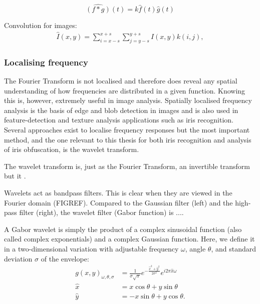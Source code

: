 \begin{equation}
    \widehat{(f*g)}(t) = k\hat{f}(t)\hat{g}(t)
\end{equation}

Convolution for images:
\begin{align}
    \hat{I}(x, y) = \sum_{i=x-s}^{x+s}\sum_{j=y-s}^{y+s} I(x,y)k(i,j),
\end{align}

\subsubsection{Localising frequency}
The Fourier Transform is not localised and therefore does reveal any spatial understanding of how frequencies are distributed in a given function. Knowing this is, however, extremely useful in image analysis. Spatially localised frequency analysis is the basis of edge and blob detection in images and is also used in feature-detection and texture analysis applications such as iris recognition. Several approaches exist to localise frequency responses but the most important method, and the one relevant to this thesis for both iris recognition and analysis of iris obfuscation, is the wavelet transform.

The wavelet transform is, just as the Fourier Transform, an invertible transform but it .

Wavelets act as bandpass filters. This is clear when they are viewed in the Fourier domain (FIGREF). Compared to the Gaussian filter (left) and the high-pass filter (right), the wavelet filter (Gabor function) is ....

A Gabor wavelet is simply the product of a complex sinusoidal function (also called complex exponentials) and a complex Gaussian function. Here, we define it in a two-dimensional variation with adjustable frequency $\omega$, angle $\theta$, and standard deviation $\sigma$ of the envelope:
\begin{align}
    g(x,y)_{\omega, \theta, \sigma} &= \frac{1}{\sigma\sqrt{\pi}} e^{-\frac{\hat{x}^2+\hat{y}^2}{2\sigma^2}} e^{i 2\pi \hat{x}\omega}\\
    \hat{x} &= x\cos\theta + y\sin\theta \\
    \hat{y} &= -x\sin\theta + y\cos\theta.
\end{align}



























